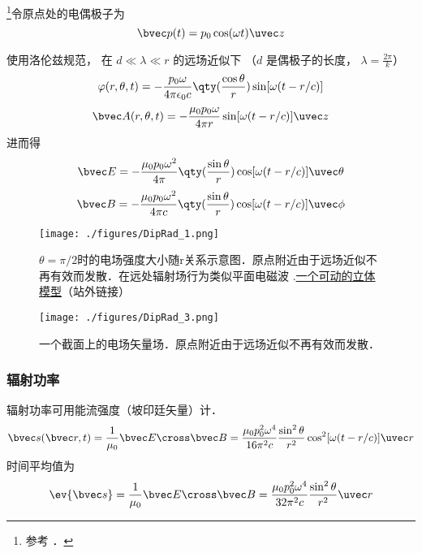 
\begin{issues}
\issueDraft
\end{issues}


\footnote{参考 \cite{GriffE}．}令原点处的电偶极子为
\begin{equation}
\bvec p(t) = p_0 \cos(\omega t) \uvec z
\end{equation}

使用洛伦兹规范， 在 $d \ll \lambda \ll r$ 的远场近似下 （$d$ 是偶极子的长度， $\lambda = \frac{2\pi}{k}$）
\begin{equation}
\varphi(r, \theta, t) = -\frac{p_0\omega}{4\pi\epsilon_0 c} \qty(\frac{\cos\theta}{r}) \sin[\omega(t - r/c)]
\end{equation}
\begin{equation}
\bvec A(r, \theta, t) = -\frac{\mu_0 p_0 \omega}{4\pi r} \sin[\omega(t - r/c)]\uvec z
\end{equation}
进而得
\begin{equation}
\bvec E = -\frac{\mu_0 p_0\omega^2}{4\pi} \qty(\frac{\sin\theta}{r})\cos[\omega(t - r/c)]\uvec \theta
\end{equation}
\begin{equation}
\bvec B = -\frac{\mu_0 p_0\omega^2}{4\pi c} \qty(\frac{\sin\theta}{r})\cos[\omega(t - r/c)]\uvec \phi
\end{equation}

\begin{figure}[ht]
\centering
\texttt{[image: ./figures/DipRad\_1.png]}
\caption{$\theta = \pi/2$时的电场强度大小随r关系示意图．原点附近由于远场近似不再有效而发散．在远处辐射场行为类似平面电磁波 .\href{https://www.geogebra.org/m/xnputtwr}{一个可动的立体模型}（站外链接）} \label{DipRad_fig1}
\end{figure}

\begin{figure}[ht]
\centering
\texttt{[image: ./figures/DipRad\_3.png]}
\caption{一个截面上的电场矢量场．原点附近由于远场近似不再有效而发散．} \label{DipRad_fig3}
\end{figure}

\subsubsection{辐射功率}
辐射功率可用能流强度（坡印廷矢量）计．
\begin{equation}
\bvec s(\bvec r, t) = \frac{1}{\mu_0} \bvec E \cross \bvec B = \frac{\mu_0p_0^2\omega^4}{16\pi^2c} \frac{\sin^2\theta}{r^2} \cos^2[\omega(t - r/c)] \uvec r
\end{equation}
时间平均值为
\begin{equation}
\ev{\bvec s} = \frac{1}{\mu_0} \bvec E \cross \bvec B
= \frac{\mu_0p_0^2\omega^4}{32\pi^2c} \frac{\sin^2\theta}{r^2} \uvec r
\end{equation}

